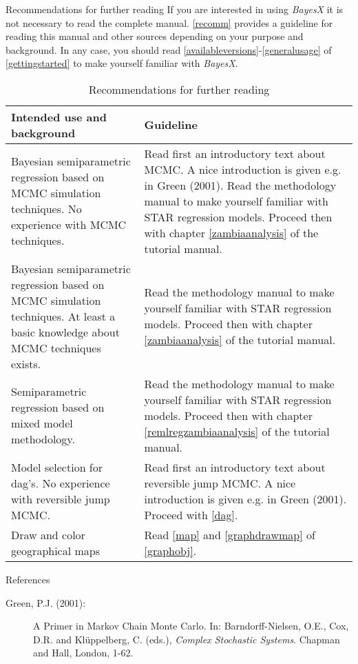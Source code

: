 \begin{stanza}{Recommendations for further reading}
If you are interested in using {\em BayesX} it is not necessary to
read the complete manual. \autoref{recomm} provides a guideline
for reading this manual and other sources depending on your
purpose and background. In any case, you should read
\autoref{availableversions}-\autoref{generalusage} of
\autoref{gettingstarted} to make yourself familiar with {\em
BayesX}.

\begin{table}[ht] \footnotesize
\hspace{1cm}\begin{tabular}{ |p{7cm}|p{7.7cm}|} \hline
{\bf Intended use and background} & {\bf Guideline} \\
\hline\hline Bayesian semiparametric regression based on MCMC
simulation techniques. No experience with MCMC techniques. & Read
first an introductory text about MCMC. A nice introduction is given
e.g. in Green (2001). Read the methodology manual to make yourself
familiar with STAR regression models.
Proceed then with chapter \ref*{zambiaanalysis} of the tutorial manual. \\
\hline Bayesian semiparametric regression based on MCMC simulation
techniques. At least a basic knowledge about MCMC techniques exists.
& Read the methodology manual to make yourself familiar with STAR
regression models. Proceed then with chapter  \ref*{zambiaanalysis} of the tutorial manual. \\
\hline Semiparametric regression based on mixed model methodology. &
Read the methodology manual to make yourself familiar with STAR
regression models. Proceed then with chapter  \ref*{remlregzambiaanalysis}  of the tutorial manual. \\
\hline Model selection for dag's. No experience with reversible jump
MCMC. & Read first an introductory text about reversible jump MCMC.
A nice introduction is
given e.g. in Green (2001). Proceed with \autoref{dag}. \\
\hline
Draw and color geographical maps & Read \autoref{map} and \autoref{graphdrawmap} of \autoref{graphobj}. \\
\hline
\end{tabular}
\begin{center}
{\em \caption {\label{recomm} Recommendations for further
reading}}
\end{center}
\end{table}
\end{stanza}

\begin{stanza}{References}

\begin{description}
\item[Green, P.J. (2001):] A Primer in Markov Chain Monte Carlo. In: Barndorff-Nielsen, O.E.,
Cox, D.R. and Kl{\"u}ppelberg, C. (eds.), {\em Complex Stochastic
Systems}. Chapman and Hall, London, 1-62.
\end{description}

\end{stanza}
